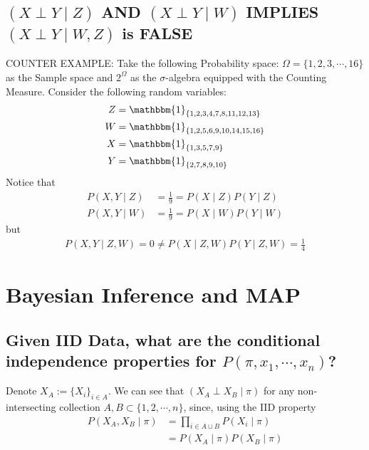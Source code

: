 \documentclass[paper=a4, fontsize=11pt]{scrartcl} %
\numberwithin{equation}{section} %
\numberwithin{figure}{section} %
\numberwithin{table}{section} %
\begin{document}
\subsection{$(X \perp Y \mid Z)$ AND $(X \perp Y \mid W)$ IMPLIES $(X \perp Y \mid W, Z)$ is FALSE}
COUNTER EXAMPLE: Take the following Probability space: $\Omega = \{ 1, 2, 3, \cdots , 16\}$ as the Sample space and $2^{\Omega}$ as the $\sigma$-algebra equipped with the Counting Measure. Consider the following random variables:
 \begin{align*}
 Z &= \mathbbm{1}_{\{1,2,3,4,7,8,11,12,13\}} \\
 W &=\mathbbm{1}_{\{1,2,5,6,9,10,14,15,16\}} \\
 X &=\mathbbm{1}_{\{1,3,5,7,9\}} \\
 Y &=\mathbbm{1}_{\{2,7,8,9,10\}} \\
\end{align*}
Notice that
\begin{align*}
P(X,Y \mid Z) &= \frac{1}{9} = P(X \mid Z)P(Y \mid Z) \\
P(X,Y \mid W) &= \frac{1}{9} = P(X \mid W)P(Y \mid W)
\end{align*}
but
\begin{align*}
P(X,Y \mid Z, W) = 0 \neq P(X \mid Z, W)P(Y \mid Z, W) = \frac{1}{4}
\end{align*}

\section{Bayesian Inference and MAP}

\subsection{Given IID Data, what are the conditional independence properties for $P(\pi, x_1, \cdots, x_n)$?}

Denote $X_A := \{X_i\}_{i \in A}$. We can see that $(X_A \perp X_B \mid \pi)$ for any non-intersecting collection $A, B \subset \{1, 2, \cdots, n\}$,
since, using the IID property
\begin{align*}
P(X_A, X_B \mid \pi) &= \prod_{i \in A \sqcup B} P(X_i \mid \pi) \\
&= P(X_A \mid \pi)P(X_B \mid \pi)
\end{align*}
\end{document}
